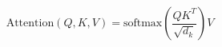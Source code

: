 \documentclass[preview]{standalone}
\begin{document}
\[
\text{Attention}(Q, K, V) = \text{softmax}\left( \frac{QK^T}{\sqrt{d_k}} \right) V
\]
\end{document}
